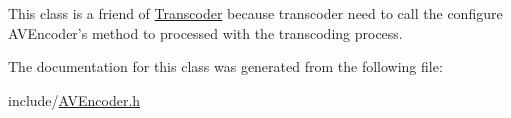 This class is a friend of \hyperlink{classbr_1_1ufscar_1_1lince_1_1streaming_1_1Transcoder}{Transcoder} because transcoder need to call the configure AVEncoder's method to processed with the transcoding process. 



The documentation for this class was generated from the following file:\begin{DoxyCompactItemize}
\item 
include/\hyperlink{AVEncoder_8h}{AVEncoder.h}\end{DoxyCompactItemize}

